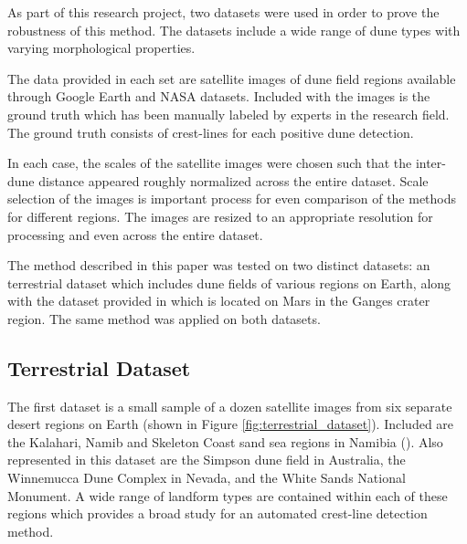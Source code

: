 \documentclass[review]{elsarticle}
\begin{document}
As part of this research project, two datasets were used in order to prove the robustness of this method. The datasets include a wide range of dune types with varying morphological properties.

The data provided in each set are satellite images of dune field regions available through Google Earth and NASA datasets. Included with the images is the ground truth which has been manually labeled by experts in the research field. The ground truth consists of crest-lines for each positive dune detection.

In each case, the scales of the satellite images were chosen such that the inter-dune distance appeared roughly normalized across the entire dataset. Scale selection of the images is important process for even comparison of the methods for different regions. The images are resized to an appropriate resolution for processing and even across the entire dataset.

The method described in this paper was tested on two distinct datasets: an terrestrial dataset which includes dune fields of various regions on Earth, along with the dataset provided in \cite{vaz_object_based_dune_analysis} which is located on Mars in the Ganges crater region. The same method was applied on both datasets.

\subsection{Terrestrial Dataset}
\label{subsec:terrestrial_dataset}
The first dataset is a small sample of a dozen satellite images from six separate desert regions on Earth (shown in Figure \ref{fig:terrestrial_dataset}). Included are the Kalahari, Namib and Skeleton Coast sand sea regions in Namibia (\cite{goudie_desert_landforms_namibia}). Also represented in this dataset are the Simpson dune field in Australia, the Winnemucca Dune Complex in Nevada, and the White Sands National Monument. A wide range of landform types are contained within each of these regions which provides a broad study for an automated crest-line detection method. 
\end{document}
